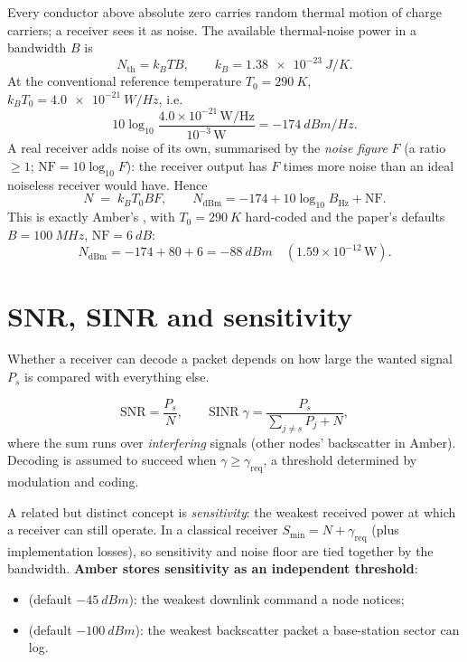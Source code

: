 Every conductor above absolute zero carries random thermal motion of charge
carriers; a receiver sees it as noise. The available thermal-noise power in a
bandwidth $B$ is
\begin{equation}
 N_{\mathrm{th}} = k_B T B,\qquad k_B=\SI{1.38e-23}{J/K}.
\end{equation}
At the conventional reference temperature $T_0=\SI{290}{K}$,
$k_BT_0 = \SI{4.0e-21}{W/Hz}$, i.e.
\[
 10\log_{10}\!\frac{4.0\times10^{-21}\,\mathrm{W/Hz}}{10^{-3}\,\mathrm{W}} = \SI{-174}{dBm/Hz}.
\]
A real receiver adds noise of its own, summarised by the \emph{noise figure} $F$
(a ratio $\ge1$; $\mathrm{NF}=10\log_{10}F$): the receiver output has
$F$ times more noise than an ideal noiseless receiver would have. Hence
\begin{equation}
 N \;=\; k_B T_0 B F,\qquad N_{\mathrm{dBm}} = -174 + 10\log_{10}B_{\mathrm{Hz}} + \mathrm{NF}.
\label{eq:noise}
\end{equation}
This is exactly Amber's ,
with $T_0=\SI{290}{K}$ hard-coded and the paper's defaults $B=\SI{100}{MHz}$,
$\mathrm{NF}=\SI{6}{dB}$:
\[
 N_{\mathrm{dBm}} = -174+80+6=\SI{-88}{dBm}\quad(1.59\times10^{-12}\,\mathrm{W}).
\]

\section{SNR, SINR and sensitivity}
\label{sec:sinr}

Whether a receiver can decode a packet depends on how large the wanted signal
$P_s$ is compared with everything else.
\begin{defbox}
\[
 \mathrm{SNR}=\frac{P_s}{N},\qquad
 \mathrm{SINR}\;\gamma=\frac{P_s}{\sum_{j\neq s}P_j+N},
\]
where the sum runs over \emph{interfering} signals (other nodes' backscatter in
Amber). Decoding is assumed to succeed when $\gamma\ge\gamma_{\mathrm{req}}$, a threshold determined
by modulation and coding.
\end{defbox}
A related but distinct concept is \emph{sensitivity}: the weakest received power
at which a receiver can still operate. In a classical receiver
$S_{\min}=N+\gamma_{\mathrm{req}}$ (plus implementation losses), so sensitivity
and noise floor are tied together by the bandwidth. \textbf{Amber stores sensitivity as an
independent threshold}:
\begin{itemize}
 \item {} (default $\SI{-45}{dBm}$): the weakest downlink command a node notices;
 \item {} (default $\SI{-100}{dBm}$): the weakest backscatter packet a base-station sector can log.
\end{itemize}


